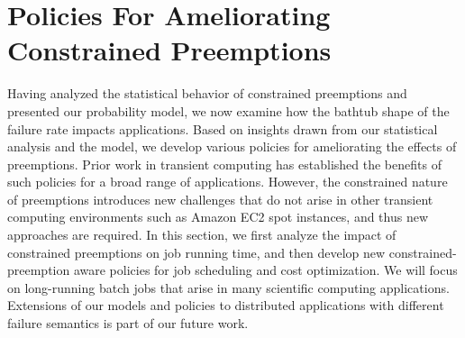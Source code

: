 \vspace*{\subsecspace}
\section{Policies For Ameliorating Constrained Preemptions}
\label{sec:policies}
Having analyzed the statistical behavior of constrained preemptions and presented our probability model, we now examine how the bathtub shape of the failure rate impacts applications. 
Based on insights drawn from our statistical analysis and the model, we develop various policies for ameliorating the effects of preemptions. 
Prior work in transient computing has established the benefits of such policies for a broad range of applications. 
However, the constrained nature of preemptions introduces new challenges that do not arise in other transient computing environments such as Amazon EC2 spot instances, and thus new approaches are required. 
In this section, we first analyze the impact of constrained preemptions on job running time, and then develop new constrained-preemption aware policies for job scheduling and cost optimization. 
We will focus on long-running batch jobs that arise in many scientific computing applications. Extensions of our models and policies to distributed applications with different failure semantics is part of our future work. 







